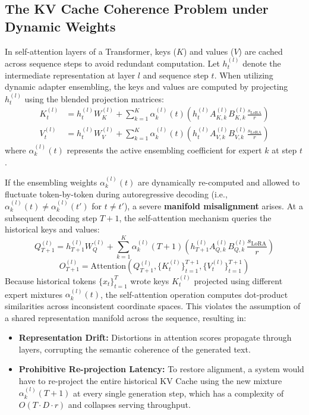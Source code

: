 \subsection{The KV Cache Coherence Problem under Dynamic Weights}
In self-attention layers of a Transformer, keys ($K$) and values ($V$) are cached across sequence steps to avoid redundant computation. Let $h_t^{(l)}$ denote the intermediate representation at layer $l$ and sequence step $t$. When utilizing dynamic adapter ensembling, the keys and values are computed by projecting $h_t^{(l)}$ using the blended projection matrices:
\begin{align}
K_t^{(l)} &= h_t^{(l)} W_K^{(l)} + \sum_{k=1}^K \alpha_k^{(l)}(t) \left( h_t^{(l)} A_{K,k}^{(l)} B_{K,k}^{(l)} \frac{s_{\text{LoRA}}}{r} \right) \\
V_t^{(l)} &= h_t^{(l)} W_V^{(l)} + \sum_{k=1}^K \alpha_k^{(l)}(t) \left( h_t^{(l)} A_{V,k}^{(l)} B_{V,k}^{(l)} \frac{s_{\text{LoRA}}}{r} \right)
\end{align}
where $\alpha_k^{(l)}(t)$ represents the active ensembling coefficient for expert $k$ at step $t$.

If the ensembling weights $\alpha_k^{(l)}(t)$ are dynamically re-computed and allowed to fluctuate token-by-token during autoregressive decoding (i.e., $\alpha_k^{(l)}(t) \neq \alpha_k^{(l)}(t')$ for $t \neq t'$), a severe \textbf{manifold misalignment} arises. At a subsequent decoding step $T+1$, the self-attention mechanism queries the historical keys and values:
\begin{equation}
Q_{T+1}^{(l)} = h_{T+1}^{(l)} W_Q^{(l)} + \sum_{k=1}^K \alpha_k^{(l)}(T+1) \left( h_{T+1}^{(l)} A_{Q,k}^{(l)} B_{Q,k}^{(l)} \frac{s_{\text{LoRA}}}{r} \right)
\end{equation}
\begin{equation}
O_{T+1}^{(l)} = \text{Attention}\left(Q_{T+1}^{(l)}, \{K_t^{(l)}\}_{t=1}^{T+1}, \{V_t^{(l)}\}_{t=1}^{T+1}\right)
\end{equation}
Because historical tokens $\{x_t\}_{t=1}^T$ wrote keys $K_t^{(l)}$ projected using different expert mixtures $\alpha_k^{(l)}(t)$, the self-attention operation computes dot-product similarities across inconsistent coordinate spaces. This violates the assumption of a shared representation manifold across the sequence, resulting in:
\begin{itemize}
    \item \textbf{Representation Drift:} Distortions in attention scores propagate through layers, corrupting the semantic coherence of the generated text.
    \item \textbf{Prohibitive Re-projection Latency:} To restore alignment, a system would have to re-project the entire historical KV Cache using the new mixture $\alpha_k^{(l)}(T+1)$ at every single generation step, which has a complexity of $O(T \cdot D \cdot r)$ and collapses serving throughput.
\end{itemize}

